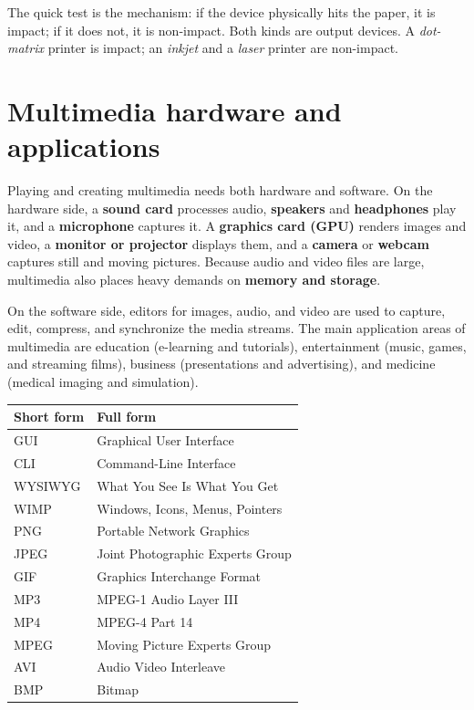 The quick test is the mechanism: if the device physically hits the paper, it
is impact; if it does not, it is non-impact. Both kinds are output devices. A
\emph{dot-matrix} printer is impact; an \emph{inkjet} and a \emph{laser}
printer are non-impact.

\section{Multimedia hardware and applications}
Playing and creating multimedia needs both hardware and software. On the
hardware side, a \textbf{sound card} processes audio, \textbf{speakers} and
\textbf{headphones} play it, and a \textbf{microphone} captures it. A
\textbf{graphics card (GPU)} renders images and video, a \textbf{monitor or
projector} displays them, and a \textbf{camera} or \textbf{webcam} captures
still and moving pictures. Because audio and video files are large, multimedia
also places heavy demands on \textbf{memory and storage}.

On the software side, editors for images, audio, and video are used to
capture, edit, compress, and synchronize the media streams. The main
application areas of multimedia are education (e-learning and tutorials),
entertainment (music, games, and streaming films), business (presentations
and advertising), and medicine (medical imaging and simulation).

\begin{center}
\begin{tabular}{p{}p{}}
\toprule
\textbf{Short form} & \textbf{Full form} \\
\midrule
GUI & Graphical User Interface \\
CLI & Command-Line Interface \\
WYSIWYG & What You See Is What You Get \\
WIMP & Windows, Icons, Menus, Pointers \\
PNG & Portable Network Graphics \\
JPEG & Joint Photographic Experts Group \\
GIF & Graphics Interchange Format \\
MP3 & MPEG-1 Audio Layer III \\
MP4 & MPEG-4 Part 14 \\
MPEG & Moving Picture Experts Group \\
AVI & Audio Video Interleave \\
BMP & Bitmap \\
\bottomrule
\end{tabular}
\end{center}

